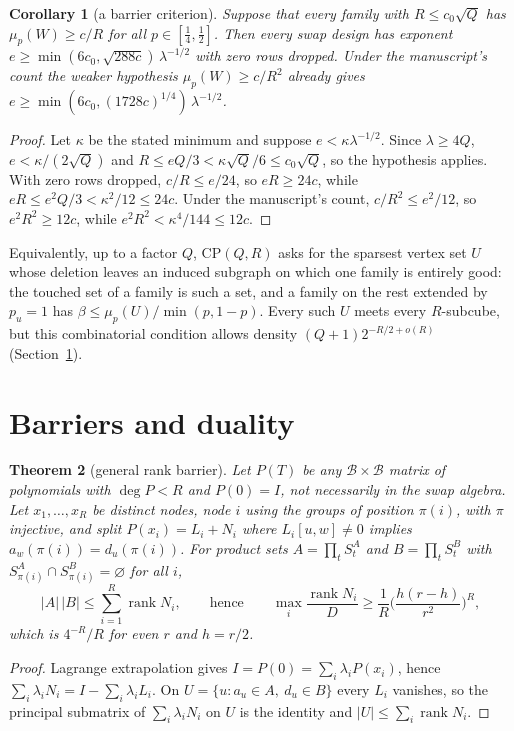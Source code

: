 \documentclass[11pt]{article}
\newtheorem{theorem}{Theorem}
\newtheorem{corollary}[theorem]{Corollary}
\theoremstyle{definition}
\theoremstyle{remark}
\newcommand{\B}{\mathcal{B}}
\newcommand{\rank}{\operatorname{rank}}
\newcommand{\CP}{\mathrm{CP}}
\begin{document}
\begin{corollary}[a barrier criterion]\label{cor:criterion}
Suppose that every family with $R\le c_0\sqrt Q$ has $\mu_p(W)\ge c/R$ for all $p\in[\frac14,\frac12]$. Then every swap design has exponent $e\ge\min(6c_0,\sqrt{288c})\,\lambda^{-1/2}$ with zero rows dropped. Under the manuscript's count the weaker hypothesis $\mu_p(W)\ge c/R^2$ already gives $e\ge\min(6c_0,(1728c)^{1/4})\,\lambda^{-1/2}$.
\end{corollary}

\begin{proof}
Let $\kappa$ be the stated minimum and suppose $e<\kappa\lambda^{-1/2}$. Since $\lambda\ge4Q$, $e<\kappa/(2\sqrt Q)$ and $R\le eQ/3<\kappa\sqrt Q/6\le c_0\sqrt Q$, so the hypothesis applies. With zero rows dropped, $c/R\le e/24$, so $eR\ge24c$, while $eR\le e^2Q/3<\kappa^2/12\le24c$. Under the manuscript's count, $c/R^2\le e^2/12$, so $e^2R^2\ge12c$, while $e^2R^2<\kappa^4/144\le12c$.
\end{proof}

Equivalently, up to a factor $Q$, $\CP(Q,R)$ asks for the sparsest vertex set $U$ whose deletion leaves an induced subgraph on which one family is entirely good: the touched set of a family is such a set, and a family on the rest extended by $p_u=1$ has $\beta\le\mu_p(U)/\min(p,1-p)$. Every such $U$ meets every $R$-subcube, but this combinatorial condition allows density $(Q+1)2^{-R/2+o(R)}$ (Section~\ref{sec:barriers}).

\section{Barriers and duality}\label{sec:barriers}

\begin{theorem}[general rank barrier]\label{thm:general}
Let $P(T)$ be any $\B\times\B$ matrix of polynomials with $\deg P<R$ and $P(0)=I$, not necessarily in the swap algebra. Let $x_1,\dots,x_R$ be distinct nodes, node $i$ using the groups of position $\pi(i)$, with $\pi$ injective, and split $P(x_i)=L_i+N_i$ where $L_i[u,w]\ne0$ implies $a_w(\pi(i))=d_u(\pi(i))$. For product sets $A=\prod_tS^A_t$ and $B=\prod_tS^B_t$ with $S^A_{\pi(i)}\cap S^B_{\pi(i)}=\varnothing$ for all $i$,
\[
|A|\,|B|\le\sum_{i=1}^R\rank N_i,\qquad\text{hence}\qquad\max_i\frac{\rank N_i}{D}\ge\frac1R\Big(\frac{h(r-h)}{r^2}\Big)^R ,
\]
which is $4^{-R}/R$ for even $r$ and $h=r/2$.
\end{theorem}

\begin{proof}
Lagrange extrapolation gives $I=P(0)=\sum_i\lambda_iP(x_i)$, hence $\sum_i\lambda_iN_i=I-\sum_i\lambda_iL_i$. On $U=\{u:a_u\in A,\ d_u\in B\}$ every $L_i$ vanishes, so the principal submatrix of $\sum_i\lambda_iN_i$ on $U$ is the identity and $|U|\le\sum_i\rank N_i$.
\end{proof}
\end{document}
